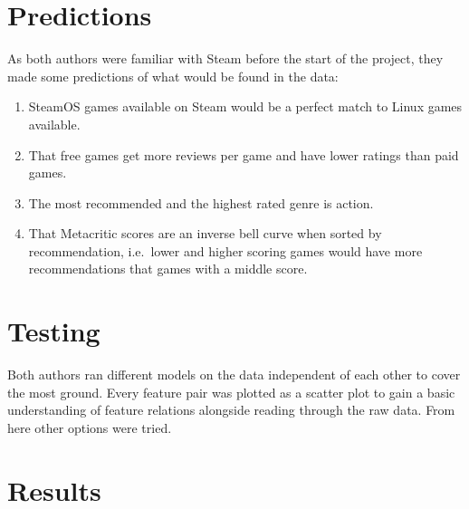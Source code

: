 \documentclass[letterpaper,10pt,twocolumn]{article}
\begin{document}

\section{Predictions}

As both authors were familiar with Steam before the start of the project, they
made some predictions of what would be found in the data:

\begin{enumerate}
    \item SteamOS games available on Steam would be a perfect match to Linux
    games available.

    \item That free games get more reviews per game and have lower ratings than
    paid games.

    \item The most recommended and the highest rated genre is action.

    \item That Metacritic scores are an inverse bell curve when sorted by
    recommendation, i.e.\ lower and higher scoring games would have more
    recommendations that games with a middle score.
\end{enumerate}



\section{Testing}

Both authors ran different models on the data independent of each other to
cover the most ground. Every feature pair was plotted as a scatter plot to
gain a basic understanding of feature relations alongside reading through the
raw data. From here other options were tried.



\section{Results}
\end{document}

